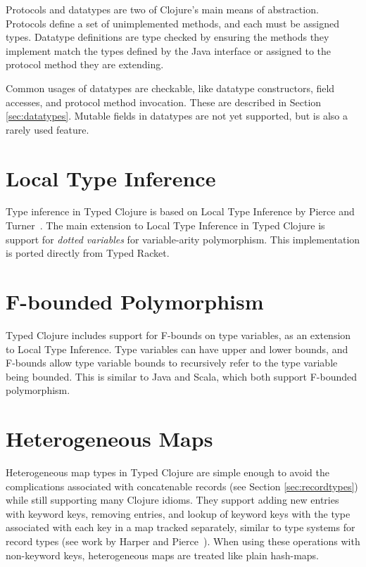 Protocols and datatypes are two of Clojure's main means of abstraction.
Protocols define a set of unimplemented methods, and each must be assigned types.
Datatype definitions are type checked by ensuring the methods they
implement match the types defined by the Java interface or assigned to the protocol method
they are extending.

Common usages of datatypes are checkable, like datatype
constructors, field accesses, and protocol method invocation.
These are described in Section \ref{sec:datatypes}.
Mutable fields in datatypes are not yet supported, but is
also a rarely used feature.

\section{Local Type Inference}

Type inference in Typed Clojure is based on Local Type Inference
by Pierce and Turner~\cite{PT00}.
The main extension to Local Type Inference in Typed Clojure
is support for \emph{dotted variables} for variable-arity polymorphism.
This implementation is ported directly from Typed Racket.

\section{F-bounded Polymorphism}

Typed Clojure includes support for F-bounds on type variables\cite{CCHOM89}, as an extension
to Local Type Inference. 
Type variables can have upper and lower bounds, and F-bounds allow type variable bounds
to recursively refer to the type variable being bounded.
This is similar to Java and Scala, which both support F-bounded polymorphism.

\section{Heterogeneous Maps}
\label{ref:designhmap}

Heterogeneous map types in Typed Clojure are simple enough to avoid
the complications associated with concatenable records (see Section \ref{sec:recordtypes})
while still supporting many Clojure idioms.
They support adding new entries with keyword keys, removing entries,
and lookup of keyword keys with the type associated with each key in
a map tracked separately, similar to type systems for record types 
(see work by Harper and Pierce~\cite{HP91}).
When using these operations with non-keyword keys, heterogeneous maps
are treated like plain hash-maps.

